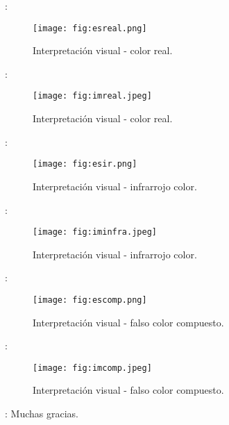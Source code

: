 \begin{frame}{\secname : \subsecname}
  \begin{figure}
    \centering
    \texttt{[image: fig:esreal.png]}
    \caption{Interpretación visual - color real. }
    \label{}
  \end{figure}
\end{frame}

\begin{frame}{\secname : \subsecname}
  \begin{figure}
    \centering
    \texttt{[image: fig:imreal.jpeg]}
    \caption{Interpretación visual - color real.}
    \label{}
  \end{figure}
\end{frame}

\begin{frame}{\secname : \subsecname}
  \begin{figure}
    \centering
    \texttt{[image: fig:esir.png]}
    \caption{Interpretación visual - infrarrojo color.}
    \label{}
  \end{figure}
\end{frame}

\begin{frame}{\secname : \subsecname}
  \begin{figure}
    \centering
    \texttt{[image: fig:iminfra.jpeg]}
    \caption{Interpretación visual - infrarrojo color.}
    \label{}
  \end{figure}
\end{frame}

\begin{frame}{\secname : \subsecname}
  \begin{figure}
    \centering
    \texttt{[image: fig:escomp.png]}
    \caption{Interpretación visual - falso color compuesto.}
    \label{}
  \end{figure}
\end{frame}

\begin{frame}{\secname : \subsecname}
  \begin{figure}
    \centering
    \texttt{[image: fig:imcomp.jpeg]}
    \caption{Interpretación visual - falso color compuesto.}
    \label{}
  \end{figure}
\end{frame}

\begin{frame}{\secname : \subsecname}
Muchas gracias.
\end{frame}
